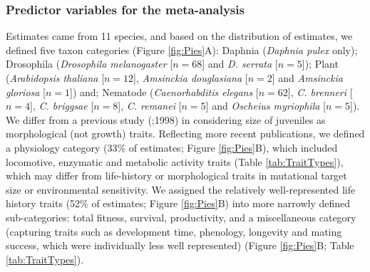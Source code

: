 \subsubsection{Predictor variables for the meta-analysis}
Estimates came from 11 species, and based on the distribution of estimates, we defined five taxon categories (Figure \ref{fig:Pies}A): Daphnia (\textit{Daphnia pulex} only); Drosophila (\textit{Drosophila melanogaster} [$n = 68$] and \textit{D. serrata} [$n = 5$]); Plant (\textit{Arabidopsis thaliana} [$n = 12$], \textit{Amsinckia douglasiana} [$n = 2$] and \textit{Amsinckia gloriosa} [$n = 1$]) and; Nematode (\textit{Caenorhabditis elegans} [$n = 62$], \textit{C. brenneri} [$n = 4$], \textit{C. briggsae} [$n = 8$], \textit{C. remanei} [$n = 5$] and \textit{Oscheius myriophila} [$n = 5$]). We differ from a previous study (\citealp{Houl96};1998) in considering size of juveniles as morphological (not growth) traits. Reflecting more recent publications, we defined a physiology category (33\% of estimates; Figure \ref{fig:Pies}B), which included locomotive, enzymatic and metabolic activity traits (Table \ref{tab:TraitTypes}), which may differ from life-history or morphological traits in mutational target size or environmental sensitivity. We assigned the relatively well-represented life history traits (52\% of estimates; Figure \ref{fig:Pies}B) into more narrowly defined sub-categories: total fitness, survival, productivity, and a miscellaneous category (capturing traits such as development time, phenology, longevity and mating success, which were individually less well represented) (Figure \ref{fig:Pies}B; Table \ref{tab:TraitTypes}).\par


